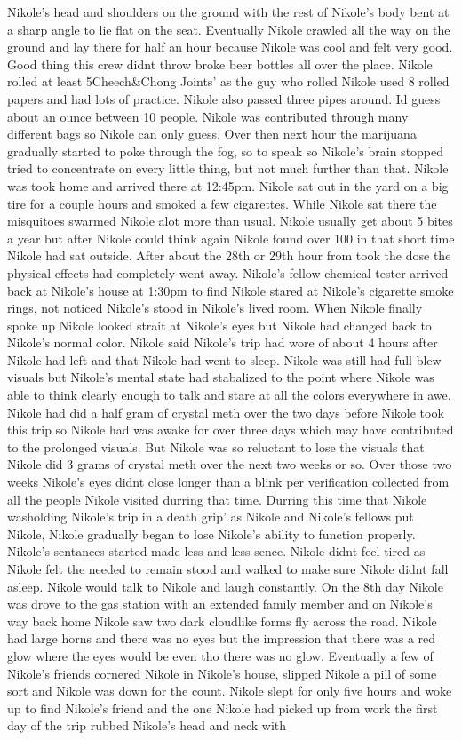 \documentclass[12pt]{book}
\begin{document}
Nikole's head and shoulders on the ground with the rest of Nikole's body bent at a sharp angle to lie flat on the seat. Eventually Nikole crawled all the way on the ground and lay there for half an hour because Nikole was cool and felt very good. Good thing this crew didnt throw broke beer bottles all over the place. Nikole rolled at least 5Cheech\&Chong Joints' as the guy who rolled Nikole used 8 rolled papers and had lots of practice. Nikole also passed three pipes around. Id guess about an ounce between 10 people. Nikole was contributed through many different bags so Nikole can only guess. Over then next hour the marijuana gradually started to poke through the fog, so to speak so Nikole's brain stopped tried to concentrate on every little thing, but not much further than that. Nikole was took home and arrived there at 12:45pm. Nikole sat out in the yard on a big tire for a couple hours and smoked a few cigarettes. While Nikole sat there the misquitoes swarmed Nikole alot more than usual. Nikole usually get about 5 bites a year but after Nikole could think again Nikole found over 100 in that short time Nikole had sat outside. After about the 28th or 29th hour from took the dose the physical effects had completely went away. Nikole's fellow chemical tester arrived back at Nikole's house at 1:30pm to find Nikole stared at Nikole's cigarette smoke rings, not noticed Nikole's stood in Nikole's lived room. When Nikole finally spoke up Nikole looked strait at Nikole's eyes but Nikole had changed back to Nikole's normal color. Nikole said Nikole's trip had wore of about 4 hours after Nikole had left and that Nikole had went to sleep. Nikole was still had full blew visuals but Nikole's mental state had stabalized to the point where Nikole was able to think clearly enough to talk and stare at all the colors everywhere in awe. Nikole had did a half gram of crystal meth over the two days before Nikole took this trip so Nikole had was awake for over three days which may have contributed to the prolonged visuals. But Nikole was so reluctant to lose the visuals that Nikole did 3 grams of crystal meth over the next two weeks or so. Over those two weeks Nikole's eyes didnt close longer than a blink per verification collected from all the people Nikole visited durring that time. Durring this time that Nikole washolding Nikole's trip in a death grip' as Nikole and Nikole's fellows put Nikole, Nikole gradually began to lose Nikole's ability to function properly. Nikole's sentances started made less and less sence. Nikole didnt feel tired as Nikole felt the needed to remain stood and walked to make sure Nikole didnt fall asleep. Nikole would talk to Nikole and laugh constantly. On the 8th day Nikole was drove to the gas station with an extended family member and on Nikole's way back home Nikole saw two dark cloudlike forms fly across the road. Nikole had large horns and there was no eyes but the impression that there was a red glow where the eyes would be even tho there was no glow. Eventually a few of Nikole's friends cornered Nikole in Nikole's house, slipped Nikole a pill of some sort and Nikole was down for the count. Nikole slept for only five hours and woke up to find Nikole's friend and the one Nikole had picked up from work the first day of the trip rubbed Nikole's head and neck with 
\end{document}
